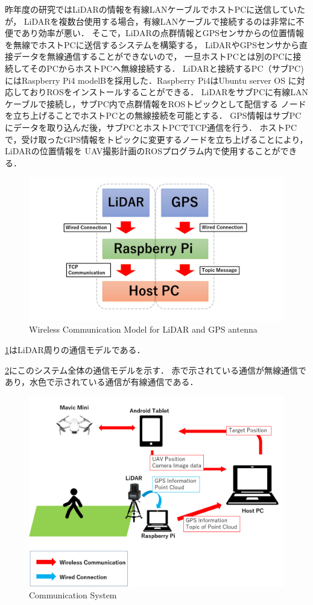 \documentclass[autodetect-engine,dvipdfmx-if-dvi,ja=standard,a4j,jbase=11pt,magstyle=nomag*]{bxjsreport}
\begin{document}
昨年度の研究ではLiDARの情報を有線LANケーブルでホストPCに送信していたが，
LiDARを複数台使用する場合，有線LANケーブルで接続するのは非常に不便であり効率が悪い．
そこで，LiDARの点群情報とGPSセンサからの位置情報を無線でホストPCに送信するシステムを構築する，
LiDARやGPSセンサから直接データを無線通信することができないので，
一旦ホストPCとは別のPCに接続してそのPCからホストPCへ無線接続する．
LiDARと接続するPC（サブPC)にはRaspberry Pi4 modelBを採用した．Raspberry Pi4はUbuntu server OS
に対応しておりROSをインストールすることができる．
LiDARをサブPCに有線LANケーブルで接続し，サブPC内で点群情報をROSトピックとして配信する
ノードを立ち上げることでホストPCとの無線接続を可能とする．
GPS情報はサブPCにデータを取り込んだ後，サブPCとホストPCでTCP通信を行う．
ホストPCで，受け取ったGPS情報をトピックに変更するノードを立ち上げることにより，LiDARの位置情報を
UAV撮影計画のROSプログラム内で使用することができる．

\begin{figure}[h]
    \centering
    \includegraphics[width=1.0\linewidth, clip]{./figure/chapter4/wireless_model.png}
    \caption{Wireless Communication Model for LiDAR and GPS antenna}
    \label{fig:wireless_model}
\end{figure}

\cref{fig:wireless_model}はLiDAR周りの通信モデルである．

\cref{fig:system}にこのシステム全体の通信モデルを示す．
赤で示されている通信が無線通信であり，水色で示されている通信が有線通信である．

\newpage
\begin{figure}[h]
    \centering
    \includegraphics[width=0.8\linewidth, clip]{./figure/chapter4/communication_model.png}
    \caption{Communication System}
    \label{fig:system}
\end{figure}
\end{document}
